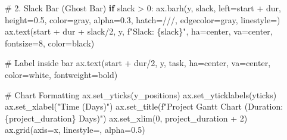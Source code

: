 \documentclass[
  letterpaper,
  DIV=11,
  numbers=noendperiod]{scrreprt}
\newenvironment{Shaded}{\begin{snugshade}}{\end{snugshade}}
\newcommand{\CommentTok}[1]{\textcolor[rgb]{0.37,0.37,0.37}{#1}}
\newcommand{\ControlFlowTok}[1]{\textcolor[rgb]{0.00,0.23,0.31}{\textbf{#1}}}
\newcommand{\DecValTok}[1]{\textcolor[rgb]{0.68,0.00,0.00}{#1}}
\newcommand{\FloatTok}[1]{\textcolor[rgb]{0.68,0.00,0.00}{#1}}
\newcommand{\NormalTok}[1]{\textcolor[rgb]{0.00,0.23,0.31}{#1}}
\newcommand{\OperatorTok}[1]{\textcolor[rgb]{0.37,0.37,0.37}{#1}}
\newcommand{\SpecialCharTok}[1]{\textcolor[rgb]{0.37,0.37,0.37}{#1}}
\newcommand{\SpecialStringTok}[1]{\textcolor[rgb]{0.13,0.47,0.30}{#1}}
\newcommand{\StringTok}[1]{\textcolor[rgb]{0.13,0.47,0.30}{#1}}
\begin{document}
\begin{Shaded}
\begin{Highlighting}[]
    \CommentTok{\# 2. Slack Bar (Ghost Bar)}
    \ControlFlowTok{if}\NormalTok{ slack }\OperatorTok{\textgreater{}} \DecValTok{0}\NormalTok{:}
\NormalTok{        ax.barh(y, slack, left}\OperatorTok{=}\NormalTok{start }\OperatorTok{+}\NormalTok{ dur, height}\OperatorTok{=}\FloatTok{0.5}\NormalTok{, }
\NormalTok{                color}\OperatorTok{=}\StringTok{\textquotesingle{}gray\textquotesingle{}}\NormalTok{, alpha}\OperatorTok{=}\FloatTok{0.3}\NormalTok{, hatch}\OperatorTok{=}\StringTok{\textquotesingle{}///\textquotesingle{}}\NormalTok{, edgecolor}\OperatorTok{=}\StringTok{\textquotesingle{}gray\textquotesingle{}}\NormalTok{, linestyle}\OperatorTok{=}\StringTok{\textquotesingle{}{-}{-}\textquotesingle{}}\NormalTok{)}
\NormalTok{        ax.text(start }\OperatorTok{+}\NormalTok{ dur }\OperatorTok{+}\NormalTok{ slack}\OperatorTok{/}\DecValTok{2}\NormalTok{, y, }\SpecialStringTok{f"Slack: }\SpecialCharTok{\{}\NormalTok{slack}\SpecialCharTok{\}}\SpecialStringTok{"}\NormalTok{, }
\NormalTok{                ha}\OperatorTok{=}\StringTok{\textquotesingle{}center\textquotesingle{}}\NormalTok{, va}\OperatorTok{=}\StringTok{\textquotesingle{}center\textquotesingle{}}\NormalTok{, fontsize}\OperatorTok{=}\DecValTok{8}\NormalTok{, color}\OperatorTok{=}\StringTok{\textquotesingle{}black\textquotesingle{}}\NormalTok{)}

    \CommentTok{\# Label inside bar}
\NormalTok{    ax.text(start }\OperatorTok{+}\NormalTok{ dur}\OperatorTok{/}\DecValTok{2}\NormalTok{, y, task, ha}\OperatorTok{=}\StringTok{\textquotesingle{}center\textquotesingle{}}\NormalTok{, va}\OperatorTok{=}\StringTok{\textquotesingle{}center\textquotesingle{}}\NormalTok{, }
\NormalTok{            color}\OperatorTok{=}\StringTok{\textquotesingle{}white\textquotesingle{}}\NormalTok{, fontweight}\OperatorTok{=}\StringTok{\textquotesingle{}bold\textquotesingle{}}\NormalTok{)}

\CommentTok{\# Chart Formatting}
\NormalTok{ax.set\_yticks(y\_positions)}
\NormalTok{ax.set\_yticklabels(yticks)}
\NormalTok{ax.set\_xlabel(}\StringTok{"Time (Days)"}\NormalTok{)}
\NormalTok{ax.set\_title(}\SpecialStringTok{f"Project Gantt Chart (Duration: }\SpecialCharTok{\{}\NormalTok{project\_duration}\SpecialCharTok{\}}\SpecialStringTok{ Days)"}\NormalTok{)}
\NormalTok{ax.set\_xlim(}\DecValTok{0}\NormalTok{, project\_duration }\OperatorTok{+} \DecValTok{2}\NormalTok{)}
\NormalTok{ax.grid(axis}\OperatorTok{=}\StringTok{\textquotesingle{}x\textquotesingle{}}\NormalTok{, linestyle}\OperatorTok{=}\StringTok{\textquotesingle{}{-}{-}\textquotesingle{}}\NormalTok{, alpha}\OperatorTok{=}\FloatTok{0.5}\NormalTok{)}


\end{Highlighting}
\end{Shaded}
\end{document}
